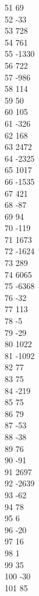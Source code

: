 { 51	69 \\
 52	-33 \\
 53	728 \\
 54	761 \\
 55	-1330 \\
 56	722 \\
 57	-986 \\
 58	114 \\
 59	50 \\
 60	105 \\
 61	-326 \\
 62	168 \\
 63	2472 \\
 64	-2325 \\
 65	1017 \\
 66	-1535 \\
 67	421 \\
 68	-87 \\
 69	94 \\
 70	-119 \\
 71	1673 \\
 72	-1624 \\
 73	289 \\
 74	6065 \\
 75	-6368 \\
 76	-32 \\
 77	113 \\
 78	-5 \\
 79	-29 \\
 80	1022 \\
 81	-1092 \\
 82	77 \\
 83	75 \\
 84	-219 \\
 85	75 \\
 86	79 \\
 87	-53 \\
 88	-38 \\
 89	76 \\
 90	-91 \\
 91	2697 \\
 92	-2639 \\
 93	-62 \\
 94	78 \\
 95	6 \\
 96	-20 \\
 97	16 \\
 98	1 \\
 99	35 \\
 100	-30 \\
 101	85 \\
}
